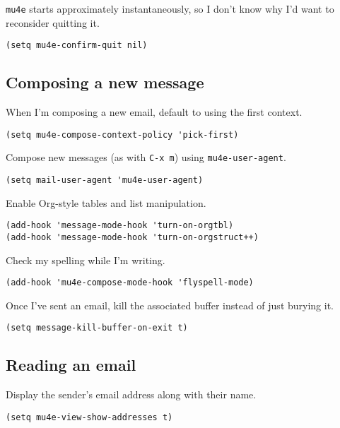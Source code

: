 \documentclass[11pt]{article}
\begin{document}
\texttt{mu4e} starts approximately instantaneously, so I don’t know why I’d want to
reconsider quitting it.

\begin{verbatim}
(setq mu4e-confirm-quit nil)
\end{verbatim}
\subsection{Composing a new message}
\label{sec:orgf9b9edb}
When I’m composing a new email, default to using the first context.

\begin{verbatim}
(setq mu4e-compose-context-policy 'pick-first)
\end{verbatim}

Compose new messages (as with \texttt{C-x m}) using \texttt{mu4e-user-agent}.

\begin{verbatim}
(setq mail-user-agent 'mu4e-user-agent)
\end{verbatim}

Enable Org-style tables and list manipulation.

\begin{verbatim}
(add-hook 'message-mode-hook 'turn-on-orgtbl)
(add-hook 'message-mode-hook 'turn-on-orgstruct++)
\end{verbatim}

Check my spelling while I'm writing.

\begin{verbatim}
(add-hook 'mu4e-compose-mode-hook 'flyspell-mode)
\end{verbatim}

Once I've sent an email, kill the associated buffer instead of just burying it.

\begin{verbatim}
(setq message-kill-buffer-on-exit t)
\end{verbatim}

\subsection{Reading an email}
\label{sec:org6a7a503}

Display the sender's email address along with their name.

\begin{verbatim}
(setq mu4e-view-show-addresses t)
\end{verbatim}
\end{document}
